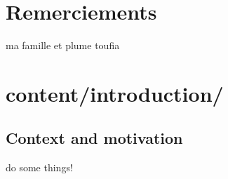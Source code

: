 \documentclass[english]{spimubphdthesis}
\begin{document}
 

\chapter*{Remerciements}
 ma famille  et plume toufia 
\tableofcontents

\mainmatter
 


\chapter{content/introduction/}
  
\section{Context and motivation}


\begin{emphbox}
	do some things!
\end{emphbox}





\end{document}
